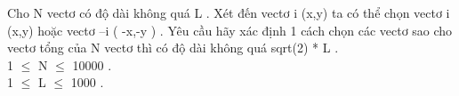 Cho N vectơ có độ dài không quá L . Xét đến vectơ i (x,y) ta có thể chọn vectơ i (x,y) hoặc vectơ –i ( -x,-y ) . Yêu cầu hãy xác định 1 cách chọn các vectơ sao cho vectơ tổng của N vectơ thì có độ dài không quá sqrt(2) * L .   
\\   1  $\le$  N  $\le$  10000 .   
\\   1  $\le$  L  $\le$  1000 .   
\\